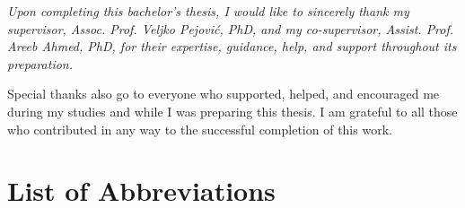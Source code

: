 \documentclass[a4paper, 12pt, openany]{book}
\newcommand{\clearemptydoublepage}{\newpage{\pagestyle{empty}\cleardoublepage}}
\begin{document}
\vfill



\vspace{2cm}

\clearemptydoublepage

\thispagestyle{empty}\mbox{}\vfill\null\it%
\noindent
Upon completing this bachelor's thesis, I would like to sincerely thank my supervisor, Assoc. Prof. Veljko Pejović, PhD, and my co-supervisor, Assist. Prof. Areeb Ahmed, PhD, for their expertise, guidance, help, and support throughout its preparation.

Special thanks also go to everyone who supported, helped, and encouraged me during my studies and while I was preparing this thesis. I am grateful to all those who contributed in any way to the successful completion of this work.
\rm\normalfont

\clearemptydoublepage




\pagestyle{empty}
\def\thepage{}%
\tableofcontents{}


\clearemptydoublepage


\chapter*{List of Abbreviations}
\end{document}
